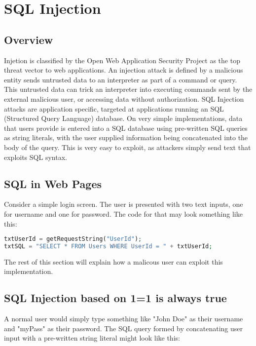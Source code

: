 \section{SQL Injection}

\subsection{Overview}
Injetion is classified by the Open Web Application Security Project as the top threat vector to web applications. An injection attack is defined by a malicious entity sends untrusted data to an interpreter as part of a command or query. This untrusted data can trick an interpreter into executing commands sent by the external malicious user, or accessing data without authorization. SQL Injection attacks are application specific, targeted at applications running an SQL (Structured Query Language) database. On very simple implementations, data that users provide is entered into a SQL database using pre-written SQL queries as string literals, with the user supplied information being concatenated into the body of the query. This is very easy to exploit, as attackers simply send text that exploits SQL syntax.

\subsection{SQL in Web Pages}

Consider a simple login screen. The user is presented with two text inputs, one for username and one for password. The code for that may look something like this:

\begin{lstlisting}[language = PHP]
txtUserId = getRequestString("UserId");
txtSQL = "SELECT * FROM Users WHERE UserId = " + txtUserId;
\end{lstlisting}

The rest of this section will explain how a malicous user can exploit this implementation.

\subsection{SQL Injection based on 1=1 is always true}

A normal user would simply type something like "John Doe" as their username and "myPass" as their password. The SQL query formed by concatenating user input with a pre-written string literal might look like this: 

